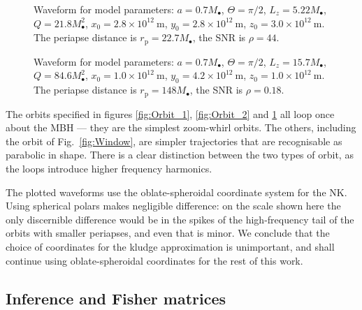 \documentclass[useAMS,usedcolumn,usegraphicx,usenatbib]{mn2e}
\newcommand{\figref}[1]{Fig.~\ref{fig:#1}}
\newcommand{\units}[1]{\ensuremath{~\mathrm{#1}}}
\newcommand{\sub}[1]{\ensuremath{_\mathrm{#1}}}
\begin{document}
\begin{figure}
  \begin{center}
    \caption{Waveform for model parameters: $a = 0.7 M_\bullet$, $\Theta = \pi/2$, $L_z = 5.22 M_\bullet$, $Q = 21.8 M_\bullet^2$, $x_0 = 2.8 \times 10^{12}\units{m}$, $y_0 = 2.8 \times 10^{12}\units{m}$, $z_0 = 3.0 \times 10^{12}\units{m}$. The periapse distance is $r\sub{p} = 22.7 M_\bullet$, the SNR is $\rho = 44$.}
    \label{fig:Orbit_6}
  \end{center}
\end{figure}
\begin{figure}
  \begin{center}
    \caption{Waveform for model parameters: $a = 0.7 M_\bullet$, $\Theta = \pi/2$, $L_z = 15.7 M_\bullet$, $Q = 84.6 M_\bullet^2$, $x_0 = 1.0 \times 10^{12}\units{m}$, $y_0 = 4.2 \times 10^{12}\units{m}$, $z_0 = 1.0 \times 10^{12}\units{m}$. The periapse distance is $r\sub{p} = 148 M_\bullet$, the SNR is $\rho = 0.18$.}
    \label{fig:Orbit_7}
  \end{center}
\end{figure}
The orbits specified in figures \ref{fig:Orbit_1}, \ref{fig:Orbit_2} and \ref{fig:Orbit_6} all loop once about the MBH --- they are the simplest zoom-whirl orbits. The others, including the orbit of \figref{Window}, are simpler trajectories that are recognisable as parabolic in shape. There is a clear distinction between the two types of orbit, as the loops introduce higher frequency harmonics.

The plotted waveforms use the oblate-spheroidal coordinate system for the NK. Using spherical polars makes negligible difference: on the scale shown here the only discernible difference would be in the spikes of the high-frequency tail of the orbits with smaller periapses, and even that is minor. We conclude that the choice of coordinates for the kludge approximation is unimportant, and shall continue using oblate-spheroidal coordinates for the rest of this work.

\subsection{Inference and Fisher matrices}
\end{document}
